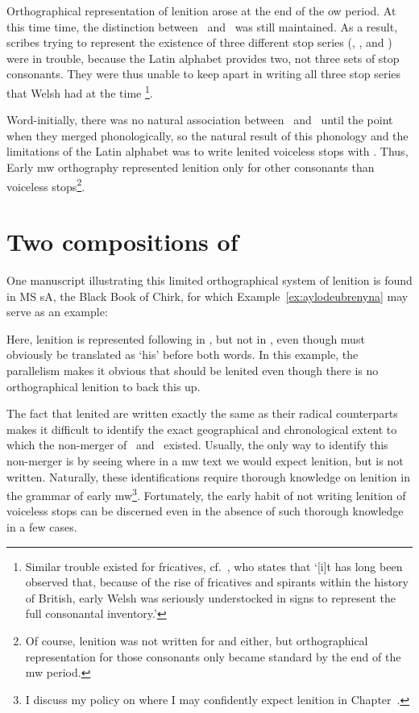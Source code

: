 Orthographical representation of lenition arose at the end of the \gls{ow} period. At this time time, the distinction between \lT\ and \xD\ was still maintained. As a result, scribes trying to represent the existence of three different stop series (\xT, \lT, and \xD) were in trouble, because the Latin alphabet  provides two, not three sets of stop consonants. They were thus unable to keep apart in writing all three stop series that Welsh had at the time%
\footnote{Similar trouble existed for fricatives, cf.\ \textcite[28]{russell_rowynniauc_2003}, who states that `[i]t has long been observed that, because of the rise of fricatives and spirants within the history of British, early Welsh was seriously understocked in signs to represent the full consonantal inventory.'}.

Word-initially, there was no natural association between \lT\ and \xD\ until the point when they merged phonologically, so the natural result of this phonology and the limitations of the Latin alphabet was to write lenited voiceless stops with . Thus, Early \gls{mw} orthography represented lenition only for other consonants than voiceless stops\footnote{Of course, lenition was not written for  and  either, but orthographical representation for those consonants only became standard by the end of the \gls{mw} period.}.


\section{Two compositions of }
\label{sec:two-exampl-mowm}
One manuscript illustrating this limited orthographical system of lenition is found in MS \gls{sA}, the Black Book of Chirk, for which Example~\ref{ex:aylodeubrenyna} may serve as an example: 


Here, lenition is represented following   in , but not in , even though  must obviously be translated as `his' before both words. In this example, the parallelism makes it obvious that  should be lenited even though there is no orthographical lenition to back this up.

The fact that lenited  are written exactly the same as their radical counterparts makes it difficult to identify the exact geographical and chronological extent to which the non-merger of \xD\ and \lT\ existed. Usually, the only way to identify this non-merger is by seeing where in a \gls{mw} text we would expect lenition, but is not written. Naturally, these identifications require thorough knowledge on lenition in  the grammar of early \gls{mw}\footnote{I discuss my policy on where I may confidently expect lenition in Chapter~.}. Fortunately, the early habit of not writing lenition of voiceless stops can be discerned even in the absence of such thorough knowledge in a few cases.


